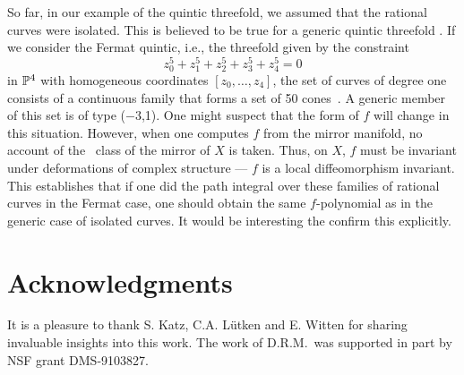 So far, in our example of the quintic threefold, we assumed that the
rational curves were isolated. This is believed to be true for a
generic quintic threefold \cite{C:ajmaps}.
If we consider the Fermat quintic, i.e.,
the threefold given by the constraint
\begin{equation}
  z_0^5+z_1^5+z_2^5+z_3^5+z_4^5=0
\end{equation}
in $\Bbb{P}^{4}$ with homogeneous coordinates $[z_0,\ldots,z_4]$, the
set of curves of degree one consists of a continuous family that forms
a set of 50 cones~\cite{Katz:50}. A generic member of this set is of
type ($-3$,1). One might suspect that the form of $f$ will change in
this situation. However, when one computes $f$ from the mirror
manifold, no account of the \K\ class of the mirror of $X$ is taken.
Thus, on $X$, $f$ must be invariant under deformations of complex
structure --- $f$ is a local diffeomorphism invariant. This establishes that
if one did the path integral over these families of rational curves in
the Fermat case, one should obtain the same $f$-polynomial as in the
generic case of isolated curves. It would be interesting the confirm
this explicitly.

\section*{Acknowledgments}

It is a pleasure to thank S. Katz, C.A. L\"utken and E. Witten for
sharing invaluable insights into this work.
The work of D.R.M.\ was supported in part by NSF grant DMS-9103827.


